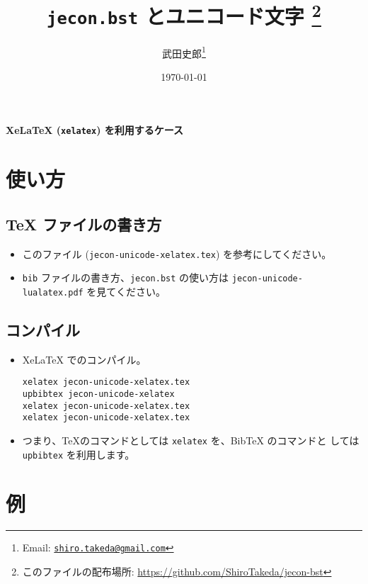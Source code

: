 \documentclass[xelatex,ja=standard]{bxjsarticle}
\title{\textbf{\texttt{jecon.bst} とユニコード文字}
\thanks{このファイルの配布場所: \url{https://github.com/ShiroTakeda/jecon-bst}}
}
\author{武田史郎\thanks{Email:
\texttt{\href{mailto:shiro.takeda@gmail.com}{shiro.takeda@gmail.com}}}}
\date{\today}
\begin{document}
\begin{flushleft}
 {\Large \textbf{XeLaTeX (\texttt{xelatex}) を利用するケース}}
\end{flushleft}

\vspace{1em}

\section{使い方}

\subsection{TeX ファイルの書き方}

\begin{itemize}
 \item このファイル (\texttt{jecon-unicode-xelatex.tex}) を参考にしてください。
 \item \texttt{bib} ファイルの書き方、\texttt{jecon.bst} の使い方は
       \texttt{jecon-unicode-lualatex.pdf} を見てください。
\end{itemize}

\subsection{コンパイル}

\begin{itemize}
 \item XeLaTeX でのコンパイル。
\begin{verbatim}
xelatex jecon-unicode-xelatex.tex
upbibtex jecon-unicode-xelatex
xelatex jecon-unicode-xelatex.tex               
xelatex jecon-unicode-xelatex.tex
\end{verbatim}
 \item つまり、\TeX のコマンドとしては \texttt{xelatex} を、BibTeX のコマンドと
       しては \texttt{upbibtex} を利用します。
\end{itemize}

\section{例}



\nocite{*}



%

\end{document}
